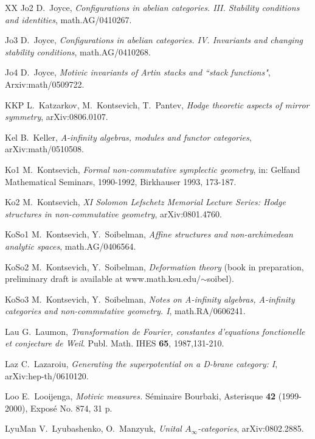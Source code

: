\documentclass[12pt]{article}
\begin{document}
\begin{thebibliography}{XX}
\bibitem
 {Jo2} D.~Joyce, {\it Configurations in abelian categories. III. Stability conditions and identities},
math.AG/0410267.



\bibitem
 {Jo3} D.~Joyce, {\it Configurations in abelian categories. IV. Invariants and changing stability
conditions}, math.AG/0410268.



\bibitem
 {Jo4} D.~Joyce, {\it Motivic invariants of Artin stacks and ``stack functions"}, Arxiv:math/0509722.

\bibitem
 {KKP} L.~Katzarkov, M.~Kontsevich, T.~Pantev, {\it Hodge theoretic aspects of mirror symmetry}, arXiv:0806.0107.

\bibitem
 {Kel} B.~Keller, {\it A-infinity algebras, modules and functor categories}, arXiv:math/0510508.


\bibitem
 {Ko1} M.~Kontsevich, {\it Formal non-commutative symplectic geometry}, in: Gelfand Mathematical Seminars, 1990-1992, Birkhauser 1993, 173-187.


\bibitem
 {Ko2} M.~Kontsevich,  {\it XI Solomon Lefschetz Memorial Lecture Series: Hodge structures in non-commutative geometry}, arXiv:0801.4760.


\bibitem
 {KoSo1} M.~Kontsevich, Y.~Soibelman, {\it Affine structures and non-archimedean analytic spaces}, math.AG/0406564.


\bibitem
 {KoSo2} M.~Kontsevich, Y.~Soibelman, {\it Deformation theory} (book in preparation, preliminary draft is available at
{www.math.ksu.edu/$\sim$soibel}).


\bibitem
 {KoSo3} M.~Kontsevich, Y.~Soibelman, {\it Notes on A-infinity algebras, A-infinity categories and non-commutative geometry. I}, math.RA/0606241.





\bibitem
 {Lau} G.~Laumon, {\it Transformation de Fourier, constantes d'equations fonctionelle et conjecture de Weil}. Publ. Math. IHES {\bf 65}, 1987,131-210.



\bibitem
 {Laz} C.~Lazaroiu, {\it  Generating the superpotential on a D-brane category: I}, arXiv:hep-th/0610120.


\bibitem
{Loo} E.~Looijenga,
{\it Motivic measures.} S\'eminaire Bourbaki, Asterisque {\bf 42} (1999-2000), Exposé No. 874, 31 p.

\bibitem
 {LyuMan}
 V.~Lyubashenko, O.~Manzyuk, {\it Unital ${A}_{\infty}$-categories}, arXiv:0802.2885.




\end{thebibliography}
\end{document}
